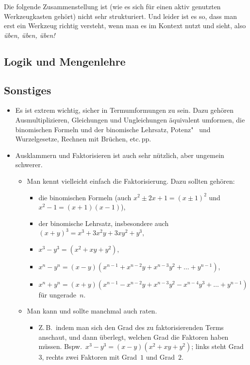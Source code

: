 \documentclass[a4paper]{article}
\begin{document}
Die folgende Zusammenstellung ist (wie es sich für einen aktiv genutzten Werkzeugkasten gehört) nicht sehr strukturiert. Und leider ist es so, dass man erst ein Werkzeug richtig versteht, wenn man es im Kontext nutzt und sieht, also \emph{üben, üben, üben!}

\subsection{Logik und Mengenlehre}

\subsection{Sonstiges}

\begin{itemize}
    \item Es ist extrem wichtig, sicher in Termumformungen zu sein. Dazu gehören Ausmultiplizieren, Gleichungen und Ungleichungen äquivalent umformen, die binomischen Formeln und der binomische Lehrsatz, Potenz"~ und Wurzelgesetze, Rechnen mit Brüchen, etc.\,pp.
    \item Ausklammern und Faktorisieren ist auch sehr nützlich, aber ungemein schwerer.
          \begin{itemize}
              \item Man kennt vielleicht einfach die Faktorisierung. Dazu sollten gehören:
                    \begin{itemize}
                        \item die binomischen Formeln (auch $x^2 \pm 2x + 1 = (x \pm 1)^2$ und $x^2 - 1 = (x+1)(x-1)$),
                        \item der binomische Lehrsatz, insbesondere auch $(x + y)^3 = x^3 + 3x^2y + 3xy^2 + y^3$,
                        \item $x^3 - y^3 = (x^2 + xy + y^2)$,
                        \item $x^n - y^n = (x-y) (x^{n-1} + x^{n-2}y + x^{n-3}y^2 + \dots + y^{n-1})$,
                        \item $x^n + y^n = (x+y) (x^{n-1} - x^{n-2}y + x^{n-3}y^2 - x^{n-4}y^3 + \dots + y^{n-1})$ für ungerade~$n$.
                    \end{itemize}
              \item Man kann und sollte manchmal auch raten.
                    \begin{itemize}
                        \item Z.\,B.\ indem man sich den Grad des zu faktorisierenden Terms anschaut, und dann überlegt, welchen Grad die Faktoren haben müssen. Bspw.\ $x^3 - y^3 = (x - y) (x^2 + xy + y^2)$; links steht Grad~$3$, rechts zwei Faktoren mit Grad~$1$ und Grad~$2$.

\end{itemize}
\end{itemize}
\end{itemize}
\end{document}
